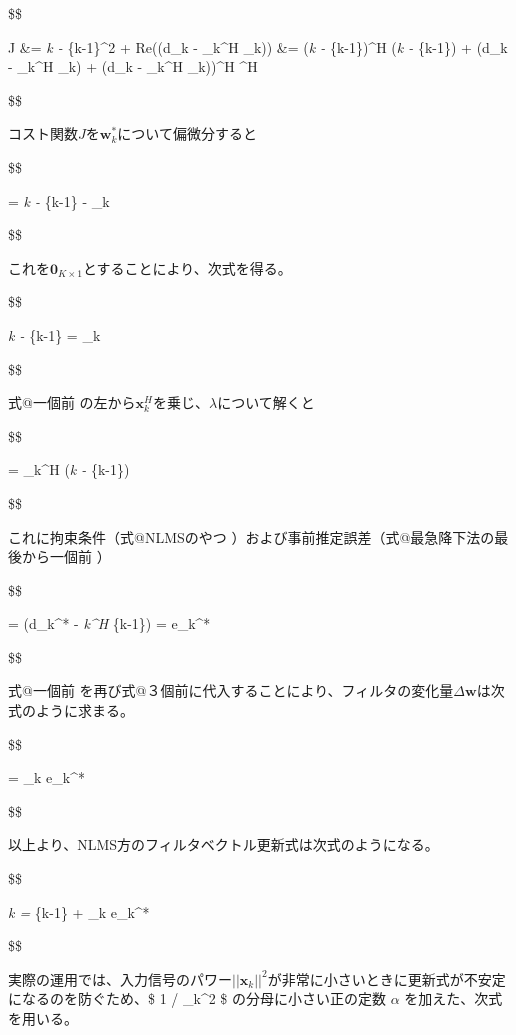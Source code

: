 \$\$

J \&= \textbar\textbar{}\emph{k -
}\{k-1\}\textbar\textbar\^{}2 + Re(\lambda (d\_k - \_k\^{}H
\_k)) \&= (\emph{k - }\{k-1\})\^{}H (\emph{k -
}\{k-1\}) + \lambda (d\_k - \_k\^{}H \_k) + (d\_k -
\_k\^{}H \_k))\^{}H \lambda\^{}H

\$\$

コスト関数\(J\)を\(\bm{w}_k^*\)について偏微分すると

\$\$

 = \emph{k - }\{k-1\}
- \lambda {}\_k

\$\$

これを\(\bm{0}_{K \times 1}\)とすることにより、次式を得る。

\$\$

\emph{k - }\{k-1\} = \lambda {}\_k

\$\$

式@一個前 の左から\(\bm{x}_k^H\)を乗じ、\(\lambda\)について解くと

\$\$

\lambda =  \_k\^{}H (\emph{k -
}\{k-1\})

\$\$

これに拘束条件（式@NLMSのやつ
）および事前推定誤差（式@最急降下法の最後から一個前 ）

\$\$

\lambda =  (d\_k\^{}* - \emph{k\^{}H
}\{k-1\}) =  e\_k\^{}*

\$\$

式@一個前
を再び式@３個前に代入することにより、フィルタの変化量\(\Delta \bm{w}\)は次式のように求まる。

\$\$

\Delta {} =  \_k e\_k\^{}*

\$\$

以上より、NLMS方のフィルタベクトル更新式は次式のようになる。

\$\$

\emph{k = }\{k-1\} + \lambda {}
\_k e\_k\^{}*

\$\$

実際の運用では、入力信号のパワー\(||\bm{x}_k||^2\)が非常に小さいときに更新式が不安定になるのを防ぐため、\$
1 / \textbar\textbar{}\_k\textbar\textbar\^{}2 \$
の分母に小さい正の定数 \(\alpha\) を加えた、次式を用いる。

